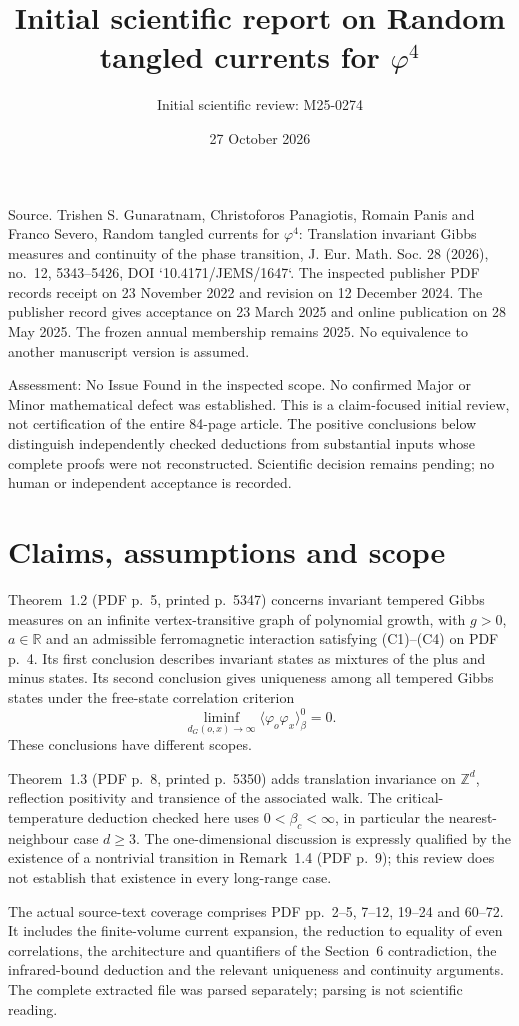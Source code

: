 \documentclass[10pt]{article}
\title{Initial scientific report on
Random tangled currents for \(\varphi^4\)}
\author{Initial scientific review: M25-0274}
\date{27 October 2026}
\begin{document}
\maketitle
Source. Trishen S. Gunaratnam, Christoforos Panagiotis, Romain Panis and Franco Severo, Random tangled currents for \(\varphi^4\): Translation invariant Gibbs measures and continuity of the phase transition, J. Eur. Math. Soc. 28 (2026), no. 12, 5343–5426, DOI `10.4171/JEMS/1647`. The inspected publisher PDF records receipt on 23 November 2022 and revision on 12 December 2024. The publisher record gives acceptance on 23 March 2025 and online publication on 28 May 2025. The frozen annual membership remains 2025. No equivalence to another manuscript version is assumed.\par
Assessment: No Issue Found in the inspected scope. No confirmed Major or Minor mathematical defect was established. This is a claim-focused initial review, not certification of the entire 84-page article. The positive conclusions below distinguish independently checked deductions from substantial inputs whose complete proofs were not reconstructed. Scientific decision remains pending; no human or independent acceptance is recorded.\par
\section*{Claims, assumptions and scope}
Theorem 1.2 (PDF p. 5, printed p. 5347) concerns invariant tempered Gibbs measures on an infinite vertex-transitive graph of polynomial growth, with \(g>0\), \(a\in\mathbb R\) and an admissible ferromagnetic interaction satisfying (C1)–(C4) on PDF p. 4. Its first conclusion describes invariant states as mixtures of the plus and minus states. Its second conclusion gives uniqueness among all tempered Gibbs states under the free-state correlation criterion \[\liminf_{d_G(o,x)\to\infty}\langle\varphi_o\varphi_x\rangle_\beta^0=0.\] These conclusions have different scopes.\par
Theorem 1.3 (PDF p. 8, printed p. 5350) adds translation invariance on \(\mathbb Z^d\), reflection positivity and transience of the associated walk. The critical-temperature deduction checked here uses \(0<\beta_c<\infty\), in particular the nearest-neighbour case \(d\ge3\). The one-dimensional discussion is expressly qualified by the existence of a nontrivial transition in Remark 1.4 (PDF p. 9); this review does not establish that existence in every long-range case.\par
The actual source-text coverage comprises PDF pp. 2–5, 7–12, 19–24 and 60–72. It includes the finite-volume current expansion, the reduction to equality of even correlations, the architecture and quantifiers of the Section 6 contradiction, the infrared-bound deduction and the relevant uniqueness and continuity arguments. The complete extracted file was parsed separately; parsing is not scientific reading.\par
\end{document}
